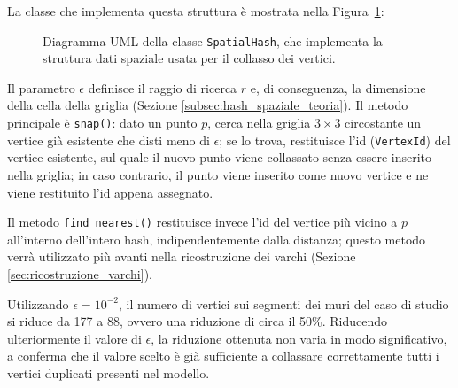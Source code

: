 La classe che implementa questa struttura è mostrata nella Figura~\ref{fig:spatialhash-uml}:
\begin{figure}[H]
	\centering
	\caption{Diagramma UML della classe \texttt{SpatialHash}, che implementa la struttura dati spaziale usata per il collasso dei vertici.}
	\label{fig:spatialhash-uml}
\end{figure}

Il parametro $\epsilon$ definisce il raggio di ricerca $r$ e, di conseguenza, la dimensione della cella della griglia (Sezione \ref{subsec:hash_spaziale_teoria}). Il metodo principale è \texttt{snap()}: dato un punto $p$, cerca nella griglia $3 \times 3$ circostante un vertice già esistente che disti meno di $\epsilon$; se lo trova, restituisce l'id (\texttt{VertexId}) del vertice esistente, sul quale il nuovo punto viene collassato senza essere inserito nella griglia; in caso contrario, il punto viene inserito come nuovo vertice e ne viene restituito l'id appena assegnato.

Il metodo \texttt{find\_nearest()} restituisce invece l'id del vertice più vicino a $p$ all'interno dell'intero hash, indipendentemente dalla distanza; questo metodo verrà utilizzato più avanti nella ricostruzione dei varchi (Sezione \ref{sec:ricostruzione_varchi}).

Utilizzando $\epsilon = 10^{-2}$, il numero di vertici sui segmenti dei muri del caso di studio si riduce da 177 a 88, ovvero una riduzione di circa il 50\%. Riducendo ulteriormente il valore di $\epsilon$, la riduzione ottenuta non varia in modo significativo, a conferma che il valore scelto è già sufficiente a collassare correttamente tutti i vertici duplicati presenti nel modello.

